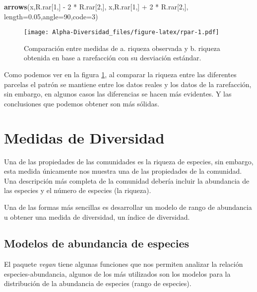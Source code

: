 \documentclass[]{book}
\newenvironment{Shaded}{\begin{snugshade}}{\end{snugshade}}
\newcommand{\KeywordTok}[1]{\textcolor[rgb]{0.13,0.29,0.53}{\textbf{{#1}}}}
\newcommand{\DataTypeTok}[1]{\textcolor[rgb]{0.13,0.29,0.53}{{#1}}}
\newcommand{\DecValTok}[1]{\textcolor[rgb]{0.00,0.00,0.81}{{#1}}}
\newcommand{\FloatTok}[1]{\textcolor[rgb]{0.00,0.00,0.81}{{#1}}}
\newcommand{\StringTok}[1]{\textcolor[rgb]{0.31,0.60,0.02}{{#1}}}
\newcommand{\NormalTok}[1]{{#1}}
\begin{document}
\begin{Shaded}
\begin{Highlighting}[]
\KeywordTok{arrows}\NormalTok{(x,R.rar[}\DecValTok{1}\NormalTok{,] -}\StringTok{ }\DecValTok{2} \NormalTok{*}\StringTok{ }\NormalTok{R.rar[}\DecValTok{2}\NormalTok{,], x,R.rar[}\DecValTok{1}\NormalTok{,] +}\StringTok{ }\DecValTok{2} \NormalTok{*}\StringTok{ }\NormalTok{R.rar[}\DecValTok{2}\NormalTok{,], }\DataTypeTok{length=}\FloatTok{0.05}\NormalTok{,}\DataTypeTok{angle=}\DecValTok{90}\NormalTok{,}\DataTypeTok{code=}\DecValTok{3}\NormalTok{)}
\end{Highlighting}
\end{Shaded}

\begin{figure}[htbp]
\centering
\texttt{[image: Alpha-Diversidad\_files/figure-latex/rpar-1.pdf]}
\caption{\label{fig:rpar}Comparación entre medidas de a. riqueza observada y
b. riqueza obtenida en base a rarefacción con su desviación estándar.}
\end{figure}

Como podemos ver en la figura \ref{fig:rpar}, al comparar la riqueza
entre las diferentes parcelas el patrón se mantiene entre los datos
reales y los datos de la rarefacción, sin embargo, en algunos casos las
diferencias se hacen más evidentes. Y las conclusiones que podemos
obtener son más sólidas.

\chapter{Medidas de Diversidad}\label{medidas-de-diversidad}

Una de las propiedades de las comunidades es la riqueza de especies, sin
embargo, esta medida únicamente nos muestra una de las propiedades de la
comunidad. Una descripción más completa de la comunidad debería incluir
la abundancia de las especies y el número de especies (la riqueza).

Una de las formas más sencillas es desarrollar un modelo de rango de
abundancia u obtener una medida de diversidad, un índice de diversidad.

\section{Modelos de abundancia de
especies}\label{modelos-de-abundancia-de-especies}

El paquete \emph{vegan} tiene algunas funciones que nos permiten
analizar la relación especies-abundancia, algunos de los más utilizados
son los modelos para la distribución de la abundancia de especies (rango
de especies).
\end{document}
